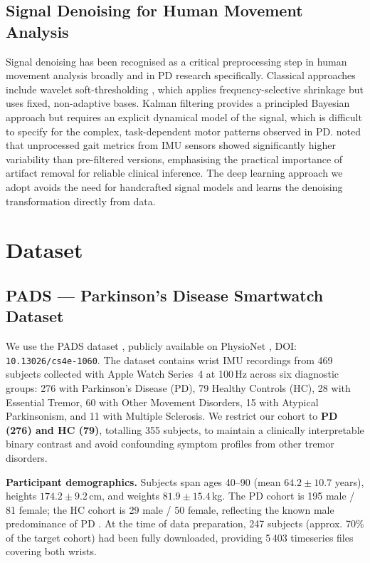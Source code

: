 \documentclass{article}
\begin{document}
\subsection{Signal Denoising for Human Movement Analysis}

Signal denoising has been recognised as a critical preprocessing step in human
movement analysis broadly and in PD research specifically.
Classical approaches include wavelet soft-thresholding \citep{donoho1995wavelet},
which applies frequency-selective shrinkage but uses fixed, non-adaptive bases.
Kalman filtering provides a principled Bayesian approach but requires an explicit
dynamical model of the signal, which is difficult to specify for the complex,
task-dependent motor patterns observed in PD.
\citet{klucken2013unbiased} noted that unprocessed gait metrics from IMU sensors
showed significantly higher variability than pre-filtered versions, emphasising
the practical importance of artifact removal for reliable clinical inference.
The deep learning approach we adopt avoids the need for handcrafted signal models
and learns the denoising transformation directly from data.

\section{Dataset}
\label{sec:dataset}

\subsection{PADS — Parkinson's Disease Smartwatch Dataset}

We use the PADS dataset \citep{varghese2023pads}, publicly available on
PhysioNet \citep{physionet2000}, DOI: \texttt{10.13026/cs4e-1060}.
The dataset contains wrist IMU recordings from 469 subjects collected with
Apple Watch Series~4 at 100\,Hz across six diagnostic groups:
276 with Parkinson's Disease (PD), 79 Healthy Controls (HC), 28 with Essential
Tremor, 60 with Other Movement Disorders, 15 with Atypical Parkinsonism, and
11 with Multiple Sclerosis.
We restrict our cohort to \textbf{PD (276) and HC (79)}, totalling 355
subjects, to maintain a clinically interpretable binary contrast and avoid
confounding symptom profiles from other tremor disorders.

\textbf{Participant demographics.}
Subjects span ages 40--90 (mean $64.2 \pm 10.7$ years), heights $174.2 \pm
9.2$\,cm, and weights $81.9 \pm 15.4$\,kg.
The PD cohort is 195 male / 81 female; the HC cohort is 29 male / 50 female,
reflecting the known male predominance of PD
\citep{poewe2017parkinson}.
At the time of data preparation, 247 subjects (approx. 70\% of the
target cohort) had been fully downloaded, providing 5\,403 timeseries files
covering both wrists.
\end{document}
